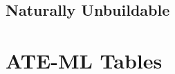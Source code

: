 \documentclass{article}
\begin{document}
{	\subsection{Naturally Unbuildable}
	
	\clearpage
	
}

\section{ATE-ML Tables}
\clearpage
%

%


\clearpage
%
%
%
%
%
%
%
%
%
%
%
%
%
\end{document}
